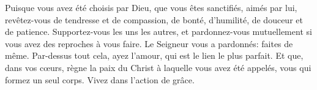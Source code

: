 Puisque vous avez été choisis par Dieu,
	que vous êtes sanctifiés, aimés par lui,
	revêtez-vous de tendresse et de compassion,
	de bonté, d’humilité, de douceur et de patience.
Supportez-vous les uns les autres,
	et pardonnez-vous mutuellement si vous avez des reproches à vous faire.
	Le Seigneur vous a pardonnés: faites de même.
Par-dessus tout cela, ayez l’amour, qui est le lien le plus parfait.
Et que, dans vos cœurs, règne la paix du Christ à laquelle vous avez été appelés,
	vous qui formez un seul corps.
	Vivez dans l’action de grâce.
